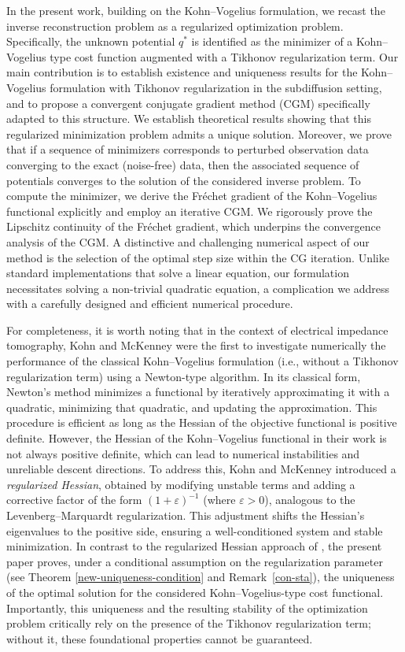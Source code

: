 \documentclass[a4paper,12pt,reqno,natbib]{amsart}
\begin{document}
In the present work, building on the Kohn--Vogelius formulation, we recast the inverse reconstruction problem as a regularized optimization problem. Specifically, the unknown potential $q^*$ is identified as the minimizer of a Kohn--Vogelius type cost function augmented with a Tikhonov regularization term. Our main contribution is to establish existence and uniqueness results for the Kohn--Vogelius formulation with Tikhonov regularization in the subdiffusion setting, and to propose a convergent conjugate gradient method (CGM) specifically adapted to this structure. We establish theoretical results showing that this regularized minimization problem admits a unique solution. Moreover, we prove that if a sequence of minimizers corresponds to perturbed observation data converging to the exact (noise-free) data, then the associated sequence of potentials converges to the solution of the considered inverse problem. To compute the minimizer, we derive the Fr\'echet gradient of the Kohn--Vogelius functional explicitly and employ an iterative CGM. We rigorously prove the Lipschitz continuity of the Fr\'echet gradient, which underpins the convergence analysis of the CGM. A distinctive and challenging numerical aspect of our method is the selection of the optimal step size within the CG iteration. Unlike standard implementations that solve a linear equation, our formulation necessitates solving a non-trivial quadratic equation, a complication we address with a carefully designed and efficient numerical procedure. 

For completeness, it is worth noting that in the context of electrical impedance tomography, 
Kohn and McKenney \cite{KohnIP1990} were the first to investigate numerically the performance of 
the classical Kohn--Vogelius formulation (i.e., without a Tikhonov regularization term) 
using a Newton-type algorithm. In its classical form, Newton's method minimizes 
a functional by iteratively approximating it with a quadratic, minimizing that quadratic, 
and updating the approximation. This procedure is efficient as long as the Hessian of the 
objective functional is positive definite. However, the Hessian of the Kohn--Vogelius functional 
in their work is not always positive definite, which can lead to numerical instabilities 
and unreliable descent directions. To address this, Kohn and McKenney introduced a 
\emph{regularized Hessian}, obtained by modifying unstable terms and adding a corrective 
factor of the form $(1+\varepsilon)^{-1}$ (where $\varepsilon>0$), analogous to the Levenberg--Marquardt regularization. 
This adjustment shifts the Hessian's eigenvalues to the positive side, ensuring a well-conditioned 
system and stable minimization. In contrast to the regularized Hessian approach of \cite{KohnIP1990}, the present paper proves, 
under a conditional assumption on the regularization parameter (see Theorem \ref{new-uniqueness-condition} and Remark~\ref{con-sta}), 
the uniqueness of the optimal solution for the considered Kohn--Vogelius-type cost functional. Importantly, this uniqueness and the resulting stability of the optimization problem critically rely on the presence of the Tikhonov regularization term; without it, these foundational properties cannot be guaranteed.
\end{document}
